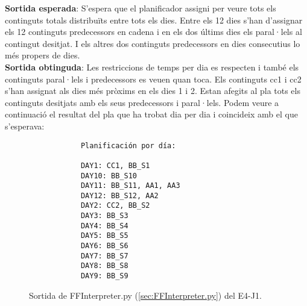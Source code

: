 \documentclass[a4paper]{article}
\begin{document}
	\noindent \textbf{Sortida esperada}: S'espera que el planificador assigni per veure tots els continguts totals distribuïts entre tots els dies. Entre els 12 dies s'han d'assignar els 12 continguts predecessors en cadena i en els dos últims dies els paral·lels al contingut desitjat. I els altres dos continguts predecessors en dies consecutius lo més propers de dies. \\
	
	\noindent \textbf{Sortida obtinguda}:  Les restriccions de temps per dia es respecten i també els continguts paral·lels i predecessors es veuen quan toca. Els continguts cc1 i cc2 s'han assignat als dies més pròxims en els dies 1 i 2. Estan afegits al pla tots els continguts desitjats amb els seus predecessors i paral·lels. Podem veure a continuació el resultat del pla que ha trobat dia per dia i coincideix amb el que s'esperava:
	
	\begin{figure}[H]
		\centering
		\begin{verbatim}
			Planificación por día:
			
			DAY1: CC1, BB_S1
			DAY10: BB_S10
			DAY11: BB_S11, AA1, AA3
			DAY12: BB_S12, AA2
			DAY2: CC2, BB_S2
			DAY3: BB_S3
			DAY4: BB_S4
			DAY5: BB_S5
			DAY6: BB_S6
			DAY7: BB_S7
			DAY8: BB_S8
			DAY9: BB_S9
		\end{verbatim}
		\caption{Sortida de FFInterpreter.py (\ref{sec:FFInterpreter.py}) del E4-J1.}
	\end{figure}
	
	
	
\end{document}
